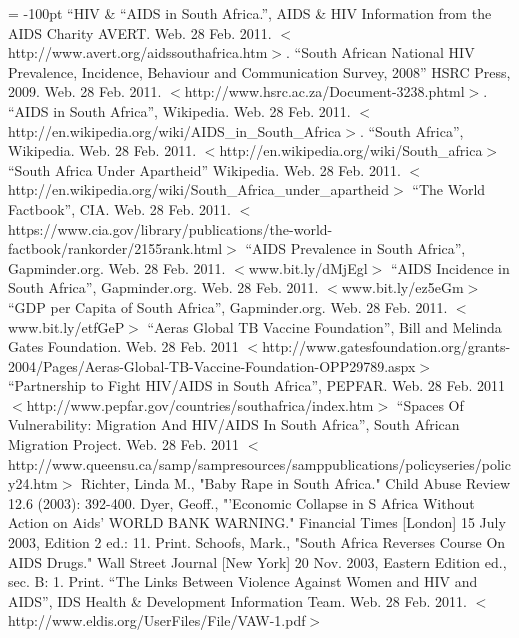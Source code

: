 \documentclass[12pt]{report}
\begin{document}
\begin{flushleft}
\begin{thebibliography}{99}
\topmargin = -100pt
    ``HIV \& ``AIDS in South Africa.'',
        AIDS \& HIV Information from the AIDS Charity AVERT. Web. 28 Feb. 2011. $<$http://www.avert.org/aidssouthafrica.htm$>$.
    ``South African National HIV Prevalence, Incidence, Behaviour and Communication Survey, 2008''
        HSRC Press, 2009. Web. 28 Feb. 2011. $<$http://www.hsrc.ac.za/Document-3238.phtml$>$. 
    ``AIDS in South Africa'',
        Wikipedia. Web. 28 Feb. 2011. $<$http://en.wikipedia.org/wiki/AIDS\_in\_South\_Africa$>$.
    ``South Africa'',
        Wikipedia. Web. 28 Feb. 2011. $<$http://en.wikipedia.org/wiki/South\_africa$>$
    ``South Africa Under Apartheid''
        Wikipedia. Web. 28 Feb. 2011. $<$http://en.wikipedia.org/wiki/South\_Africa\_under\_apartheid$>$
    ``The World Factbook'',
        CIA. Web. 28 Feb. 2011. $<$https://www.cia.gov/library/publications/the-world-factbook/rankorder/2155rank.html$>$
    ``AIDS Prevalence in South Africa'',
        Gapminder.org. Web. 28 Feb. 2011. $<$www.bit.ly/dMjEgl$>$
    ``AIDS Incidence in South Africa'',
        Gapminder.org. Web. 28 Feb. 2011. $<$www.bit.ly/ez5eGm$>$
    ``GDP per Capita of South Africa'',
        Gapminder.org. Web. 28 Feb. 2011. $<$www.bit.ly/etfGeP$>$
    ``Aeras Global TB Vaccine Foundation'',
        Bill and Melinda Gates Foundation. Web. 28 Feb. 2011 $<$http://www.gatesfoundation.org/grants-2004/Pages/Aeras-Global-TB-Vaccine-Foundation-OPP29789.aspx$>$
    ``Partnership to Fight HIV/AIDS in South Africa'',
        PEPFAR. Web. 28 Feb. 2011 $<$http://www.pepfar.gov/countries/southafrica/index.htm$>$
    ``Spaces Of Vulnerability: Migration And HIV/AIDS In South Africa'', 
        South African Migration Project. Web. 28 Feb. 2011 $<$http://www.queensu.ca/samp/sampresources/samppublications/policyseries/policy24.htm$>$
    Richter, Linda M.,
        "Baby Rape in South Africa." Child Abuse Review 12.6 (2003): 392-400.
    Dyer, Geoff.,
        "'Economic Collapse in S Africa Without Action on Aids' WORLD BANK WARNING." Financial Times [London] 15 July 2003, Edition 2 ed.: 11. Print.
    Schoofs, Mark.,
        "South Africa Reverses Course On AIDS Drugs." Wall Street Journal [New York] 20 Nov. 2003, Eastern Edition ed., sec. B: 1. Print.
    ``The Links Between Violence Against Women and HIV and AIDS'',
        IDS Health \& Development Information Team. Web. 28 Feb. 2011. $<$http://www.eldis.org/UserFiles/File/VAW-1.pdf$>$
\end{thebibliography}
\end{flushleft}
\end{document}

